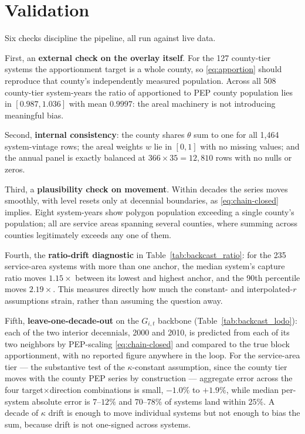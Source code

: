\documentclass[11pt]{article}
\begin{document}




\section{Validation}
\label{sec:validation}

Six checks discipline the pipeline, all run against live data.

First, an \textbf{external check on the overlay itself}. For the 127
county-tier systems the apportionment target is a whole county, so
\eqref{eq:apportion} should reproduce that county's independently measured
population. Across all 508 county-tier system-years the ratio of apportioned
to PEP county population lies in $[0.987,1.036]$ with mean $0.9997$: the areal
machinery is not introducing meaningful bias.

Second, \textbf{internal consistency}: the county shares $\theta$ sum to one
for all 1,464 system-vintage rows; the areal weights $w$ lie in $[0,1]$ with
no missing values; and the annual panel is exactly balanced at
$366\times 35=12{,}810$ rows with no nulls or zeros.

Third, a \textbf{plausibility check on movement}. Within decades the series
moves smoothly, with level resets only at decennial boundaries, as
\eqref{eq:chain-closed} implies. Eight system-years show polygon population
exceeding a single county's population; all are service areas spanning
several counties, where summing across counties legitimately exceeds any one
of them.

Fourth, the \textbf{ratio-drift diagnostic} in Table~\ref{tab:backcast_ratio}:
for the 235 service-area systems with more than one anchor, the median
system's capture ratio moves $1.15\times$ between its lowest and highest
anchor, and the 90th percentile moves $2.19\times$. This measures directly how
much the constant- and interpolated-$r$ assumptions strain, rather than
assuming the question away.

Fifth, \textbf{leave-one-decade-out} on the $G_{i,t}$ backbone
(Table~\ref{tab:backcast_lodo}): each of the two interior decennials, 2000 and
2010, is predicted from each of its two neighbors by PEP-scaling
\eqref{eq:chain-closed} and compared to the true block apportionment, with no
reported figure anywhere in the loop. For the service-area tier --- the
substantive test of the $\kappa$-constant assumption, since the county tier
moves with the county PEP series by construction --- aggregate error across
the four target$\times$direction combinations is small, $-1.0\%$ to $+1.9\%$,
while median per-system absolute error is $7$--$12\%$ and $70$--$78\%$ of
systems land within $25\%$. A decade of $\kappa$ drift is enough to move
individual systems but not enough to bias the sum, because drift is not
one-signed across systems.
\end{document}

